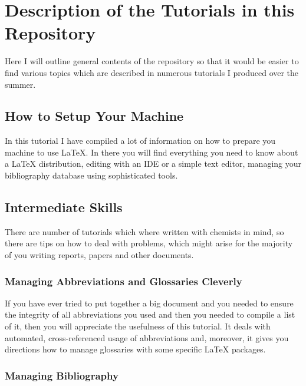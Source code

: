 \documentclass[
    draft
    ]{scrartcl}
\begin{document}
\section{Description of the Tutorials in this Repository}


%
Here I will outline general contents of the repository so that it would be
    easier to find various topics which are described in numerous tutorials I
    produced over the summer.

%
\subsection{How to Setup Your Machine}

%
In this tutorial I have compiled a lot of information on how to prepare you
    machine to use \LaTeX{}.
%
In there you will find everything you need to know about a \LaTeX{}
    distribution, editing with an IDE or a simple text editor, managing your
    bibliography database using sophisticated tools.

%
\subsection{Intermediate Skills}

%
There are number of tutorials which where written with chemists in mind, so
    there are tips on how to deal with problems, which might arise for the
    majority of you writing reports, papers and other documents.

%
\subsubsection{Managing Abbreviations and Glossaries Cleverly}

%
If you have ever tried to put together a big document and you needed to ensure
    the integrity of all abbreviations you used and then you needed to compile a
    list of it, then you will appreciate the usefulness of this tutorial.
%
It deals with automated, cross-referenced usage of abbreviations and, moreover,
    it gives you directions how to manage glossaries with some specific \LaTeX{}
    packages.

%
\subsubsection{Managing Bibliography}
\end{document}
